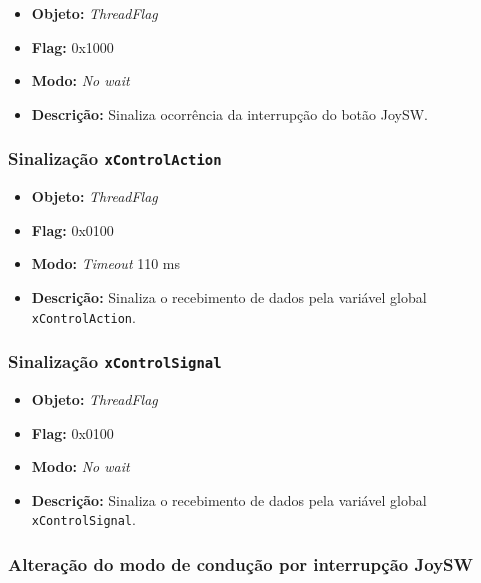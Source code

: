 	\begin{itemize}
		\item \textbf{Objeto:} \textit{ThreadFlag}
		\item \textbf{Flag:} 0x1000
		\item \textbf{Modo:} \textit{No wait}
		\item \textbf{Descrição:} Sinaliza ocorrência da interrupção do botão JoySW.
		
	\end{itemize}


\subsubsection*{Sinalização \texttt{xControlAction}}
	
	\begin{itemize}
		\item \textbf{Objeto:} \textit{ThreadFlag}
		\item \textbf{Flag:} 0x0100
		\item \textbf{Modo:} \textit{Timeout} 110 ms
		\item \textbf{Descrição:} Sinaliza o recebimento de dados pela variável global \texttt{xControlAction}.
		
	\end{itemize}	

\subsubsection*{Sinalização \texttt{xControlSignal}}
	
	\begin{itemize}
		\item \textbf{Objeto:} \textit{ThreadFlag}
		\item \textbf{Flag:} 0x0100
		\item \textbf{Modo:} \textit{No wait}
		\item \textbf{Descrição:} Sinaliza o recebimento de dados pela variável global \texttt{xControlSignal}.
		
	\end{itemize}	



\subsubsection*{Alteração do modo de condução por interrupção JoySW}
	
